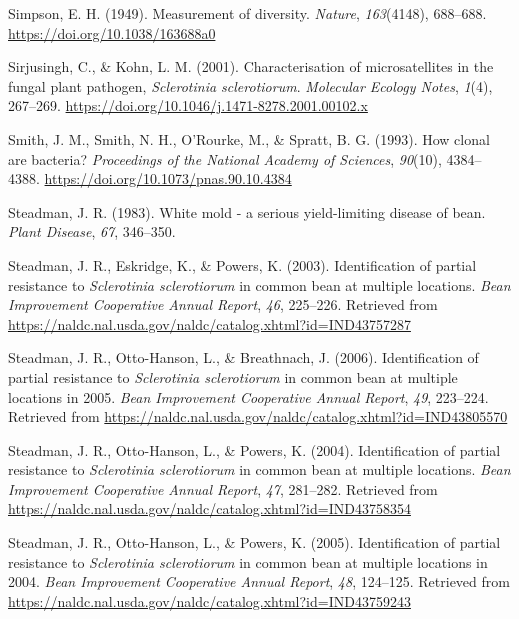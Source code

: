 \documentclass[fleqn,10pt,lineno]{wlpeerj} %
\theoremstyle{definition}
\theoremstyle{definition}
\theoremstyle{definition}
\theoremstyle{remark}
\begin{document}
\hypertarget{ref-simpson1949measurement}{}
Simpson, E. H. (1949). Measurement of diversity. \emph{Nature},
\emph{163}(4148), 688--688. \url{https://doi.org/10.1038/163688a0}

\hypertarget{ref-sirjusingh2001characterisation}{}
Sirjusingh, C., \& Kohn, L. M. (2001). Characterisation of
microsatellites in the fungal plant pathogen, \emph{Sclerotinia
sclerotiorum}. \emph{Molecular Ecology Notes}, \emph{1}(4), 267--269.
\url{https://doi.org/10.1046/j.1471-8278.2001.00102.x}

\hypertarget{ref-smith1993how}{}
Smith, J. M., Smith, N. H., O'Rourke, M., \& Spratt, B. G. (1993). How
clonal are bacteria? \emph{Proceedings of the National Academy of
Sciences}, \emph{90}(10), 4384--4388.
\url{https://doi.org/10.1073/pnas.90.10.4384}

\hypertarget{ref-steadman1983white}{}
Steadman, J. R. (1983). White mold - a serious yield-limiting disease of
bean. \emph{Plant Disease}, \emph{67}, 346--350.

\hypertarget{ref-steadman2003identification}{}
Steadman, J. R., Eskridge, K., \& Powers, K. (2003). Identification of
partial resistance to \emph{Sclerotinia sclerotiorum} in common bean at
multiple locations. \emph{Bean Improvement Cooperative Annual Report},
\emph{46}, 225--226. Retrieved from
\url{https://naldc.nal.usda.gov/naldc/catalog.xhtml?id=IND43757287}

\hypertarget{ref-steadman2006identification}{}
Steadman, J. R., Otto-Hanson, L., \& Breathnach, J. (2006).
Identification of partial resistance to \emph{Sclerotinia sclerotiorum}
in common bean at multiple locations in 2005. \emph{Bean Improvement
Cooperative Annual Report}, \emph{49}, 223--224. Retrieved from
\url{https://naldc.nal.usda.gov/naldc/catalog.xhtml?id=IND43805570}

\hypertarget{ref-steadman2004identification}{}
Steadman, J. R., Otto-Hanson, L., \& Powers, K. (2004). Identification
of partial resistance to \emph{Sclerotinia sclerotiorum} in common bean
at multiple locations. \emph{Bean Improvement Cooperative Annual
Report}, \emph{47}, 281--282. Retrieved from
\url{https://naldc.nal.usda.gov/naldc/catalog.xhtml?id=IND43758354}

\hypertarget{ref-steadman2005identification}{}
Steadman, J. R., Otto-Hanson, L., \& Powers, K. (2005). Identification
of partial resistance to \emph{Sclerotinia sclerotiorum} in common bean
at multiple locations in 2004. \emph{Bean Improvement Cooperative Annual
Report}, \emph{48}, 124--125. Retrieved from
\url{https://naldc.nal.usda.gov/naldc/catalog.xhtml?id=IND43759243}
\end{document}
